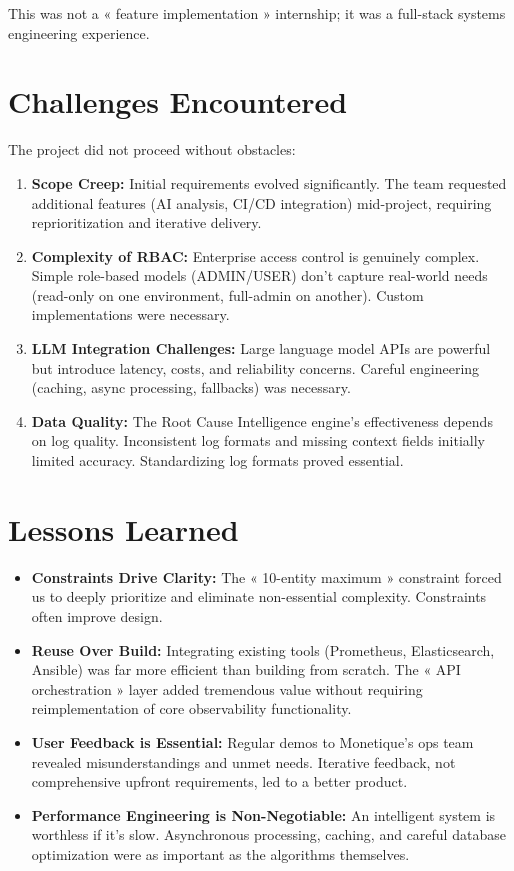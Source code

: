 \documentclass[12pt,a4paper]{report}
\begin{document}
This was not a « feature implementation » internship; it was a full-stack systems engineering experience.

\section*{Challenges Encountered}

The project did not proceed without obstacles:

\begin{enumerate}
  \item \textbf{Scope Creep:} Initial requirements evolved significantly. The team requested additional features (AI analysis, CI/CD integration) mid-project, requiring reprioritization and iterative delivery.
  
  \item \textbf{Complexity of RBAC:} Enterprise access control is genuinely complex. Simple role-based models (ADMIN/USER) don't capture real-world needs (read-only on one environment, full-admin on another). Custom implementations were necessary.
  
  \item \textbf{LLM Integration Challenges:} Large language model APIs are powerful but introduce latency, costs, and reliability concerns. Careful engineering (caching, async processing, fallbacks) was necessary.
  
  \item \textbf{Data Quality:} The Root Cause Intelligence engine's effectiveness depends on log quality. Inconsistent log formats and missing context fields initially limited accuracy. Standardizing log formats proved essential.
\end{enumerate}

\section*{Lessons Learned}

\begin{itemize}
  \item \textbf{Constraints Drive Clarity:} The « 10-entity maximum » constraint forced us to deeply prioritize and eliminate non-essential complexity. Constraints often improve design.
  
  \item \textbf{Reuse Over Build:} Integrating existing tools (Prometheus, Elasticsearch, Ansible) was far more efficient than building from scratch. The « API orchestration » layer added tremendous value without requiring reimplementation of core observability functionality.
  
  \item \textbf{User Feedback is Essential:} Regular demos to Monetique's ops team revealed misunderstandings and unmet needs. Iterative feedback, not comprehensive upfront requirements, led to a better product.
  
  \item \textbf{Performance Engineering is Non-Negotiable:} An intelligent system is worthless if it's slow. Asynchronous processing, caching, and careful database optimization were as important as the algorithms themselves.
\end{itemize}
\end{document}
